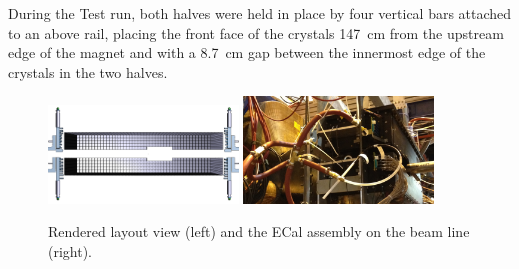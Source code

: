 \documentclass[final,3p,times,twocolumn]{elsarticle}
\begin{document}
During the Test run, both halves were held in place by four vertical bars attached to an above rail, 
placing the front face of the crystals 147~cm from the upstream edge of the magnet and with a 
8.7~cm gap between the innermost edge of the crystals in the two halves.
\begin{center}
{\small
\begin{figure}[htb]
\includegraphics[width=0.45\textwidth]{figures/ECal}
\includegraphics[width=0.45\textwidth]{figures/ecal_picture_beamline}
\caption{Rendered layout view (left) and the ECal assembly on the beam line (right).}
\label{fig:ecal}
\end{figure}
}
\end{center}
\end{document}
